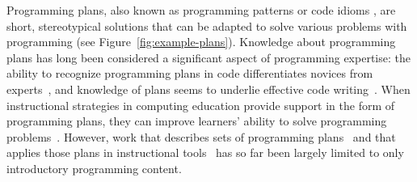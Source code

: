 Programming plans, also known as programming patterns \cite{Iyer_PatternCensus_SIGCSE-2021, muller_pattern-oriented_2007} or code idioms \cite{haggis_code_similarity}, are short, stereotypical solutions that can be adapted to solve various problems with programming (see Figure~\ref{fig:example-plans}). Knowledge about programming plans has long been considered a significant aspect of programming expertise: 
the ability to recognize programming plans in code differentiates novices from experts~\cite{Soloway1984EmpiricalSO}, and knowledge of plans seems to underlie effective code writing~\cite{robins201912, spohrer_goalplan_1985}. 
When instructional strategies in computing education provide support in the form of programming plans, they can improve learners' ability to solve programming problems~\cite{Castro_ImpactSingleLecturePlans_Koli2017, muller_pattern-oriented_2007, Weinman_Fox_Faded_Parsons}. However, work that describes sets of programming plans~\cite{Spohrer1985-pi, Rist1989-fo, muller_pattern-oriented_2007, izu_inventory_2021, Iyer_PatternCensus_SIGCSE-2021} and that applies those plans in instructional tools~\cite{ Weinman_Fox_Faded_Parsons, Jigsaw} has so far been largely limited to only introductory programming content.

